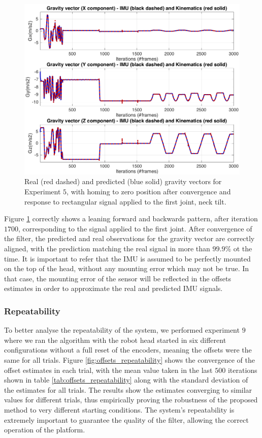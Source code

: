 \begin{figure}
 \includegraphics[width=0.975\columnwidth]{images/results/gravity_all}
\caption{Real (red dashed) and predicted (blue solid) gravity vectors for Experiment $5$, with homing to zero position after convergence and response to rectangular signal applied to the first joint, neck tilt.}
\label{fig:real_predicted_imu}
\end{figure}

Figure \ref{fig:real_predicted_imu} correctly shows a leaning forward and backwards pattern, after iteration $1700$, corresponding to the signal applied to the first joint. After convergence of the filter, the predicted and real observations for the gravity vector are correctly aligned, with the prediction matching the real signal in more than $99.9\%$ ot the time. It is important to refer that the IMU is assumed to be perfectly mounted on the top of the head, without any mounting error which may not be true. In that case, the mounting error of the sensor will be reflected in the offsets estimates in order to approximate the real and predicted IMU signals.

\subsubsection{Repeatability}

To better analyse the repeatability of the system, we performed experiment $9$ where we ran the algorithm with the robot head started in six different configurations without a full reset of the encoders, meaning the offsets were the same
for all trials. Figure \ref{fig:offsets_repeatability} shows the convergence of the offset estimates in each trial, with the mean value taken in the last $500$ iterations shown in table \ref{tab:offsets_repeatability} along with the standard deviation of the estimates for all trials. The results show the estimates converging to similar values for different trials, thus empirically proving the robustness of the proposed method to very different starting conditions. The system's repeatability is extremely important to guarantee the quality of the filter, allowing the correct operation of the platform.

